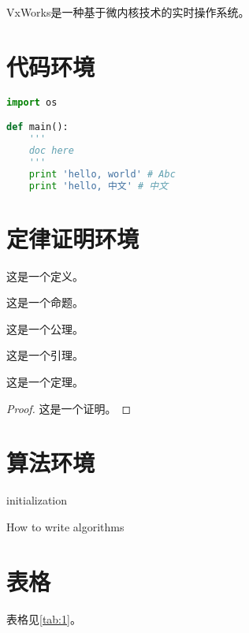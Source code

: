 \documentclass[format=draft,language=chinese,degree=master]{hustthesis}
\begin{document}
VxWorks是一种基于微内核技术的实时操作系统。


\section{代码环境}

\begin{lstlisting}[language=python]
import os

def main():
    '''
    doc here
    '''
    print 'hello, world' # Abc
    print 'hello, 中文' # 中文
\end{lstlisting}

\section{定律证明环境}

\begin{definition}\label{def:1}
这是一个定义。
\end{definition}
\begin{proposition}\label{proposition:1}
这是一个命题。
\end{proposition}
\begin{axiom}\label{axiom:1}
这是一个公理。
\end{axiom}
\begin{lemma}\label{lemma:1}
这是一个引理。
\end{lemma}
\begin{theorem}\label{theorem:1}
这是一个定理。
\end{theorem}
\begin{proof}\label{proof:1}
这是一个证明。
\end{proof}

\section{算法环境}

\begin{algorithm}[H]
\SetAlgoLined
{}
initialization\;\label{alg_line:1}
\caption{How to write algorithms}\label{alg:1}
\end{algorithm}

\section{表格}
表格见\autoref{tab:1}。
\end{document}
